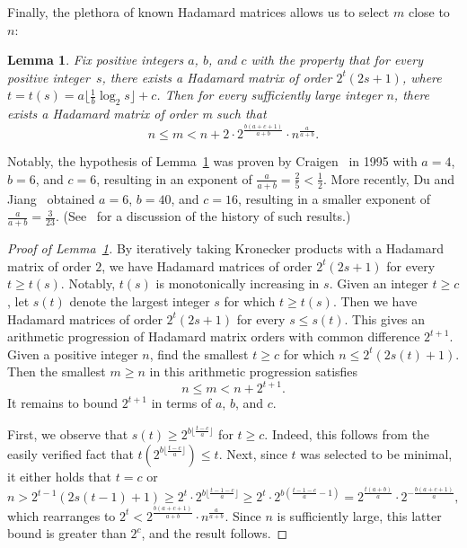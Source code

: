 \documentclass[11pt]{article}
\theoremstyle{plain}
\newtheorem{lemma}[theorem]{Lemma}
\theoremstyle{definition}
\begin{document}
Finally, the plethora of known Hadamard matrices allows us to select $m$ close to $n$:

\begin{lemma}
\label{lem.hadamard gaps}
Fix positive integers $a$, $b$, and $c$ with the property that for every positive integer~$s$, there exists a Hadamard matrix of order $2^t(2s+1)$, where $t=t(s)=a\lfloor\frac{1}{b}\log_2 s\rfloor + c$.
Then for every sufficiently large integer $n$, there exists a Hadamard matrix of order m such that
\[
n
\leq m
< n + 2\cdot 2^{\frac{b(a+c+1)}{a+b}}\cdot n^{\frac{a}{a+b}}.
\]
\end{lemma}

Notably, the hypothesis of Lemma~\ref{lem.hadamard gaps} was proven by Craigen~\cite{Craigen:95} in 1995 with $a=4$, $b=6$, and $c=6$, resulting in an exponent of $\frac{a}{a+b}=\frac{2}{5}<\frac{1}{2}$.
More recently, Du and Jiang~\cite{DuJ:24} obtained $a=6$, $b=40$, and $c=16$, resulting in a smaller exponent of $\frac{a}{a+b}=\frac{3}{23}$.
(See~\cite{DuJ:24} for a discussion of the history of such results.)

\begin{proof}[Proof of Lemma~\ref{lem.hadamard gaps}]
By iteratively taking Kronecker products with a Hadamard matrix of order $2$, we have Hadamard matrices of order $2^t(2s+1)$ for every $t\geq t(s)$.
Notably, $t(s)$ is monotonically increasing in $s$.
Given an integer $t\geq c$, let $s(t)$ denote the largest integer $s$ for which $t\geq t(s)$.
Then we have Hadamard matrices of order $2^t(2s+1)$ for every $s\leq s(t)$.
This gives an arithmetic progression of Hadamard matrix orders with common difference $2^{t+1}$.
Given a positive integer $n$, find the smallest $t\geq c$ for which $n\leq 2^t(2s(t)+1)$.
Then the smallest $m\geq n$ in this arithmetic progression satisfies
\[
n\leq m < n + 2^{t+1}.
\]
It remains to bound $2^{t+1}$ in terms of $a$, $b$, and $c$.

First, we observe that $s(t)\geq 2^{b\lfloor \frac{t-c}{a}\rfloor}$ for $t\geq c$.
Indeed, this follows from the easily verified fact that $t(2^{b\lfloor \frac{t-c}{a}\rfloor})\leq t$.
Next, since $t$ was selected to be minimal, it either holds that $t=c$ or 
\[
n
>2^{t-1}(2s(t-1)+1)
\geq 2^{t}\cdot 2^{b\lfloor \frac{t-1-c}{a}\rfloor}
\geq 2^t\cdot 2^{b(\frac{t-1-c}{a}-1)}
=2^{\frac{t(a+b)}{a}}\cdot2^{-\frac{b(a+c+1)}{a}},
\]
which rearranges to $2^t<2^{\frac{b(a+c+1)}{a+b}}\cdot n^{\frac{a}{a+b}}$.
Since $n$ is sufficiently large, this latter bound is greater than $2^c$, and the result follows.
\end{proof}
\end{document}
